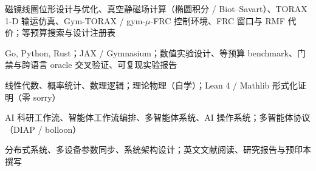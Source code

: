 \documentclass[10pt,a4paper]{article}
\begin{document}
\begin{description}[leftmargin=2.2cm, labelsep=0.3cm, topsep=2pt, itemsep=1pt]
\item[聚变与仿真] 磁镜线圈位形设计与优化、真空静磁场计算（椭圆积分 / Biot--Savart）、TORAX 1-D 输运仿真、Gym-TORAX / gym-$\mu$-FRC 控制环境、FRC 窗口与 RMF 代价；等预算搜索与设计注册表
\item[数值与语言] Go, Python, Rust；JAX / Gymnasium；数值实验设计、等预算 benchmark、门禁与跨语言 oracle 交叉验证、可复现实验报告
\item[数学与形式化] 线性代数、概率统计、数理逻辑；理论物理（自学）；Lean 4 / Mathlib 形式化证明（零 sorry）
\item[AI 科研系统] AI 科研工作流、智能体工作流编排、多智能体系统、AI 操作系统；多智能体协议（DIAP / bolloon）
\item[系统与协作] 分布式系统、多设备参数同步、系统架构设计；英文文献阅读、研究报告与预印本撰写
\end{description}
\end{document}
